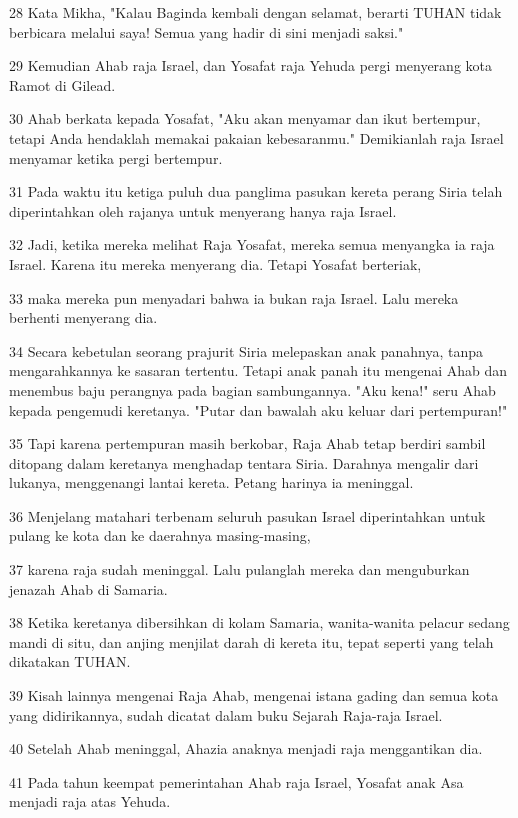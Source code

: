 \par 28 Kata Mikha, "Kalau Baginda kembali dengan selamat, berarti TUHAN tidak berbicara melalui saya! Semua yang hadir di sini menjadi saksi."
\par 29 Kemudian Ahab raja Israel, dan Yosafat raja Yehuda pergi menyerang kota Ramot di Gilead.
\par 30 Ahab berkata kepada Yosafat, "Aku akan menyamar dan ikut bertempur, tetapi Anda hendaklah memakai pakaian kebesaranmu." Demikianlah raja Israel menyamar ketika pergi bertempur.
\par 31 Pada waktu itu ketiga puluh dua panglima pasukan kereta perang Siria telah diperintahkan oleh rajanya untuk menyerang hanya raja Israel.
\par 32 Jadi, ketika mereka melihat Raja Yosafat, mereka semua menyangka ia raja Israel. Karena itu mereka menyerang dia. Tetapi Yosafat berteriak,
\par 33 maka mereka pun menyadari bahwa ia bukan raja Israel. Lalu mereka berhenti menyerang dia.
\par 34 Secara kebetulan seorang prajurit Siria melepaskan anak panahnya, tanpa mengarahkannya ke sasaran tertentu. Tetapi anak panah itu mengenai Ahab dan menembus baju perangnya pada bagian sambungannya. "Aku kena!" seru Ahab kepada pengemudi keretanya. "Putar dan bawalah aku keluar dari pertempuran!"
\par 35 Tapi karena pertempuran masih berkobar, Raja Ahab tetap berdiri sambil ditopang dalam keretanya menghadap tentara Siria. Darahnya mengalir dari lukanya, menggenangi lantai kereta. Petang harinya ia meninggal.
\par 36 Menjelang matahari terbenam seluruh pasukan Israel diperintahkan untuk pulang ke kota dan ke daerahnya masing-masing,
\par 37 karena raja sudah meninggal. Lalu pulanglah mereka dan menguburkan jenazah Ahab di Samaria.
\par 38 Ketika keretanya dibersihkan di kolam Samaria, wanita-wanita pelacur sedang mandi di situ, dan anjing menjilat darah di kereta itu, tepat seperti yang telah dikatakan TUHAN.
\par 39 Kisah lainnya mengenai Raja Ahab, mengenai istana gading dan semua kota yang didirikannya, sudah dicatat dalam buku Sejarah Raja-raja Israel.
\par 40 Setelah Ahab meninggal, Ahazia anaknya menjadi raja menggantikan dia.
\par 41 Pada tahun keempat pemerintahan Ahab raja Israel, Yosafat anak Asa menjadi raja atas Yehuda.

